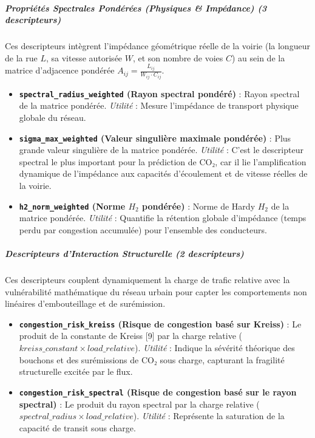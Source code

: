 \documentclass[10pt, a4paper]{article}
\providecommand{\tightlist}{}
\begin{document}
\subparagraph{Propriétés Spectrales Pondérées (Physiques \& Impédance)
(3
descripteurs)}\label{propriuxe9tuxe9s-spectrales-ponduxe9ruxe9es-physiques-impuxe9dance-3-descripteurs}

Ces descripteurs intègrent l'impédance géométrique réelle de la voirie
(la longueur de la rue \(L\), sa vitesse autorisée \(W\), et son nombre
de voies \(C\)) au sein de la matrice d'adjacence pondérée
\(A_{ij} = \frac{L_{ij}}{W_{ij} \cdot C_{ij}}\).

\begin{itemize}
\tightlist
\item
  \textbf{\texttt{spectral\_radius\_weighted} (Rayon spectral pondéré)}
  : Rayon spectral de la matrice pondérée. \emph{Utilité} : Mesure
  l'impédance de transport physique globale du réseau.
\item
  \textbf{\texttt{sigma\_max\_weighted} (Valeur singulière maximale
  pondérée)} : Plus grande valeur singulière de la matrice pondérée.
  \emph{Utilité} : C'est le descripteur spectral le plus important pour
  la prédiction de CO₂, car il lie l'amplification dynamique de
  l'impédance aux capacités d'écoulement et de vitesse réelles de la
  voirie.
\item
  \textbf{\texttt{h2\_norm\_weighted} (Norme \(H_2\) pondérée)} : Norme
  de Hardy \(H_2\) de la matrice pondérée. \emph{Utilité} : Quantifie la
  rétention globale d'impédance (temps perdu par congestion accumulée)
  pour l'ensemble des conducteurs.
\end{itemize}

\subparagraph{Descripteurs d'Interaction Structurelle (2
descripteurs)}\label{descripteurs-dinteraction-structurelle-2-descripteurs}

Ces descripteurs couplent dynamiquement la charge de trafic relative
avec la vulnérabilité mathématique du réseau urbain pour capter les
comportements non linéaires d'embouteillage et de surémission.

\begin{itemize}
\tightlist
\item
  \textbf{\texttt{congestion\_risk\_kreiss} (Risque de congestion basé
  sur Kreiss)} : Le produit de la constante de Kreiss {[}9{]} par la
  charge relative (\(kreiss\_constant \times load\_relative\)).
  \emph{Utilité} : Indique la sévérité théorique des bouchons et des
  surémissions de CO₂ sous charge, capturant la fragilité structurelle
  excitée par le flux.
\item
  \textbf{\texttt{congestion\_risk\_spectral} (Risque de congestion basé
  sur le rayon spectral)} : Le produit du rayon spectral par la charge
  relative (\(spectral\_radius \times load\_relative\)). \emph{Utilité}
  : Représente la saturation de la capacité de transit sous charge.
\end{itemize}
\end{document}
